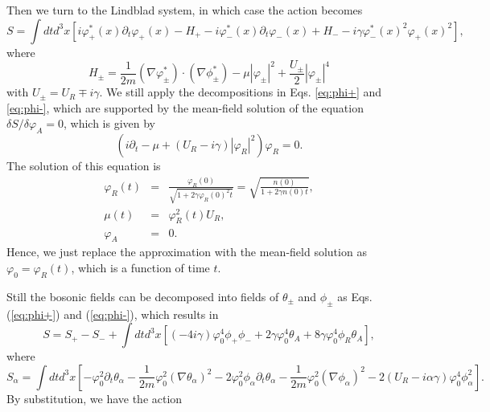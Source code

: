 \documentclass[aps,superscriptaddress,notitlepage,longbibliography]{revtex4-1}
\begin{document}
Then we turn to the Lindblad system, in which case the action becomes
\begin{equation}
S=\int dtd^{3}x[i\varphi_{+}^{\ast}(x)\partial_{t}\varphi_{+}(x)-H_{+}-i\varphi_{-}^{\ast}(x)\partial_{t}\varphi_{-}(x)+H_{-}-i\gamma\varphi_{-}^{\ast}(x)^{2}\varphi_{+}(x)^{2}],
\end{equation}
where 
\begin{equation}
H_{\pm}=\frac{1}{2m}(\nabla\varphi_{\pm}^{\ast})\cdot(\nabla\phi_{\pm}^{\ast})-\mu|\varphi_{\pm}|^{2}+\frac{U_{\pm}}{2}|\varphi_{\pm}|^{4}
\end{equation}
with $U_{\pm}=U_{R}\mp i\gamma$. We still apply the decompositions
in Eqs. \eqref{eq:phi+} and \eqref{eq:phi-}, which are supported
by the mean-field solution of the equation $\delta S/\delta\varphi_{A}=0$,
which is given by 
\begin{equation}
(i\partial_{t}-\mu+(U_{R}-i\gamma)|\varphi_{R}|^{2})\varphi_{R}=0.
\end{equation}
The solution of this equation is 
\begin{eqnarray*}
\varphi_{R}(t) & = & \frac{\varphi_{R}(0)}{\sqrt{1+2\gamma\varphi_{R}(0)^{2}t}}=\sqrt{\frac{n(0)}{1+2\gamma n(0)t}},\\
\mu(t) & = & \varphi_{R}^{2}(t)U_{R},\\
\varphi_{A} & = & 0.
\end{eqnarray*}
Hence, we just replace the approximation with the mean-field solution
as $\varphi_{0}=\varphi_{R}(t)$, which is a function of time $t$.

Still the bosonic fields can be decomposed into fields of $\theta_{\pm}$
and $\phi_{\pm}$ as Eqs. (\ref{eq:phi+}) and (\ref{eq:phi-}), which
results in
\begin{equation}
S=S_{+}-S_{-}+\int dtd^{3}x[(-4i\gamma)\varphi_{0}^{4}\phi_{+}\phi_{-}+2\gamma\varphi_{0}^{4}\theta_{A}+8\gamma\varphi_{0}^{4}\phi_{R}\theta_{A}],
\end{equation}
where 
\begin{equation}
S_{\alpha}=\int dtd^{3}x\left[-\varphi_{0}^{2}\partial_{t}\theta_{\alpha}-\frac{1}{2m}\varphi_{0}^{2}(\nabla\theta_{\alpha})^{2}-2\varphi_{0}^{2}\phi_{\alpha}\partial_{t}\theta_{\alpha}-\frac{1}{2m}\varphi_{0}^{2}(\nabla\phi_{\alpha})^{2}-2(U_{R}-i\alpha\gamma)\varphi_{0}^{4}\phi_{\alpha}^{2}\right].
\end{equation}
By substitution, we have the action
\end{document}
